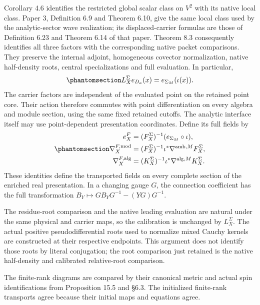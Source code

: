\documentclass[
  english,
  11pt,
  reqno]{amsart}
\begin{document}
Corollary 4.6 identifies the restricted global scalar class on \(V^2\)
with its native local class. Paper 3, Definition 6.9 and Theorem 6.10,
give the same local class used by the analytic-sector wave realization;
its displaced-carrier formulas are those of Definition 6.23 and Theorem
6.14 of that paper. Theorem 8.3 consequently identifies all three
factors with the corresponding native packet comparisons. They preserve
the internal adjoint, homogeneous covector normalization, native
half-density roots, central specializations and full evaluation. In
particular,
\begin{equation}\protect\phantomsection\label{eq:analytic-bridge-full-evaluation-transfer}{
L_X^\Sigma e_{D_a}(x)=e_{\Sigma_M}(\iota(x)).
}\end{equation} The carrier factors are independent of the evaluated
point on the retained point core. Their action therefore commutes with
point differentiation on every algebra and module section, using the
same fixed retained cutoffs. The analytic interface itself may use
point-dependent presentation coordinates. Define its full fields by
\begin{equation}\protect\phantomsection\label{eq:analytic-bridge-transferred-full-fields}{
\begin{aligned}
e_X^F
 &=(F_X^\Sigma)^{-1}(e_{\Sigma_M}\circ\iota),\\
\nabla_X^{F,\mathrm{mod}}
 &=(F_X^\Sigma)^{-1}\iota^*\nabla^{\mathrm{amb},M}F_X^\Sigma,\\
\nabla_X^{F,\mathrm{alg}}
 &=(K_X^\Sigma)^{-1}\iota^*\nabla^{\mathrm{alg},M}K_X^\Sigma.
\end{aligned}
}\end{equation} These identities define the transported fields on every
complete section of the enriched real presentation. In a changing gauge
\(G\), the connection coefficient has the full transformation
\(B_Y\mapsto GB_YG^{-1}-(YG)G^{-1}\).

The residue-root comparison and the native leading evaluation are
natural under the same physical and carrier maps, so the calibration is
unchanged by \(L_X^\Sigma\). The actual positive pseudodifferential
roots used to normalize mixed Cauchy kernels are constructed at their
respective endpoints. This argument does not identify those roots by
literal conjugation; the root comparison just retained is the native
half-density and calibrated relative-root comparison.

The finite-rank diagrams are compared by their canonical metric and
actual spin identifications from Proposition 15.5 and §6.3. The
initialized finite-rank transports agree because their initial maps and
equations agree.
\end{document}
